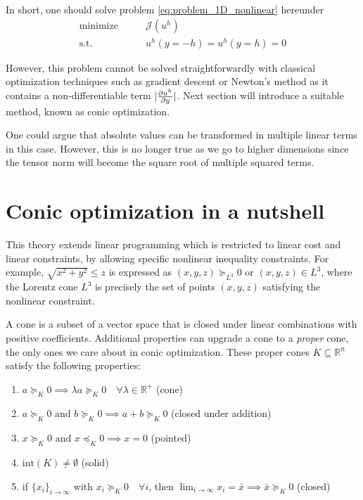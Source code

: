 \documentclass[11 pt]{report}
\begin{document}
In short, one should solve problem \eqref{eq:problem_1D_nonlinear} hereunder
\begin{equation}
    \begin{aligned}
        \textrm{minimize} \qquad & \mathcal{J}(u^h)\\
        \textrm{s.t.} \qquad & u^h(y=-h) = u^h(y=h) = 0
    \end{aligned}\label{eq:problem_1D_nonlinear}
\end{equation}

However, this problem cannot be solved straightforwardly with classical optimization techniques such as gradient descent or Newton's method as it contains a non-differentiable term $|\pdv{u^h}{y}|$. Next section will introduce a suitable method, known as conic optimization.

One could argue that absolute values can be transformed in multiple linear terms in this case. However, this is no longer true as we go to higher dimensions since the tensor norm will become the square root of multiple squared terms. 

\section{Conic optimization in a nutshell}
This theory extends linear programming which is restricted to linear cost and linear constraints, by allowing specific nonlinear inequality constraints. For example, $\sqrt{x^2+y^2} \leq z$ is expressed as $(x,y,z) \succeq_{L^3} 0$ or $(x,y,z) \in L^3$, where the Lorentz cone $L^3$ is precisely the set of points $(x,y,z)$ satisfying the nonlinear constraint.

A cone is a subset of a vector space that is closed under linear combinations with positive coefficients. Additional properties can upgrade a cone to a \textit{proper} cone, the only ones we care about in conic optimization. These proper cones $K\subseteq \mathbb{R}^n$ satisfy the following properties:
\begin{enumerate}
    \item $a \succeq_K 0 \implies \lambda a \succeq_K 0 \quad \forall \lambda \in \mathbb{R}^+$ (cone)
    \item $a \succeq_K 0 \text{ and } b \succeq_K 0 \implies a + b \succeq_K 0$ (closed under addition)
    \item $x \succeq_K 0 \text{ and } x \preceq_K 0 \implies x = 0$ (pointed)
    \item $\textrm{int}(K) \neq \emptyset$ (solid)
    \item if $\{x_i\}_{i\to\infty}$ with $x_i \succeq_K 0 \quad \forall i$, then $\lim_{i\to\infty} x_i = \bar x \implies \bar x \succeq_K 0$ (closed)
\end{enumerate}
\end{document}
